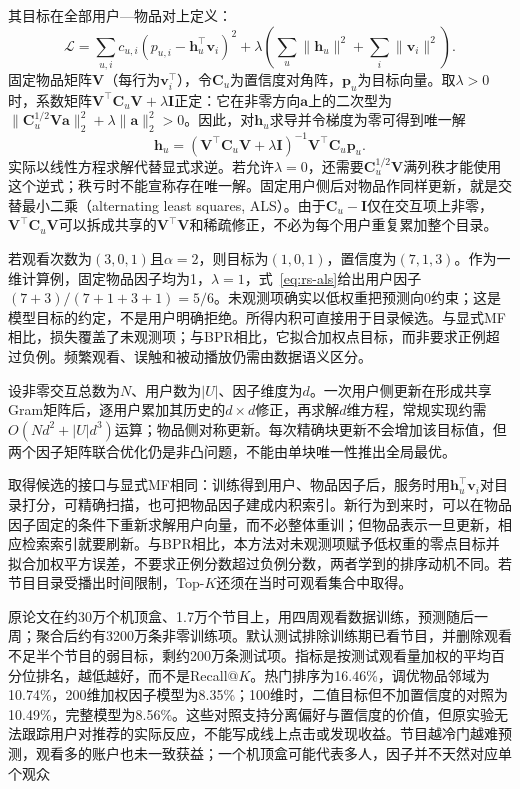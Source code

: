 其目标在全部用户—物品对上定义：
\begin{equation}
 \mathcal L=\sum_{u,i}c_{u,i}(p_{u,i}-\bm h_u^\top\bm v_i)^2
 +\lambda\left(\sum_u\|\bm h_u\|^2+\sum_i\|\bm v_i\|^2\right).
 \label{eq:rs-implicit-mf}
\end{equation}
固定物品矩阵$\bm V$（每行为$\bm v_i^\top$），令$\bm C_u$为置信度对角阵，$\bm p_u$为目标向量。取$\lambda>0$时，系数矩阵$\bm V^\top\bm C_u\bm V+\lambda\bm I$正定：它在非零方向$\bm a$上的二次型为$\|\bm C_u^{1/2}\bm V\bm a\|_2^2+\lambda\|\bm a\|_2^2>0$。因此，对$\bm h_u$求导并令梯度为零可得到唯一解
\begin{equation}
 \bm h_u=(\bm V^\top\bm C_u\bm V+\lambda\bm I)^{-1}
             \bm V^\top\bm C_u\bm p_u.
 \label{eq:rs-als}
\end{equation}
实际以线性方程求解代替显式求逆。若允许$\lambda=0$，还需要$\bm C_u^{1/2}\bm V$满列秩才能使用这个逆式；秩亏时不能宣称存在唯一解。固定用户侧后对物品作同样更新，就是交替最小二乘（alternating least squares, ALS）。由于$\bm C_u-\bm I$仅在交互项上非零，$\bm V^\top\bm C_u\bm V$可以拆成共享的$\bm V^\top\bm V$和稀疏修正，不必为每个用户重复累加整个目录。

若观看次数为$(3,0,1)$且$\alpha=2$，则目标为$(1,0,1)$，置信度为$(7,1,3)$。作为一维计算例，固定物品因子均为1，$\lambda=1$，式~\eqref{eq:rs-als}给出用户因子$(7+3)/(7+1+3+1)=5/6$。未观测项确实以低权重把预测向0约束；这是模型目标的约定，不是用户明确拒绝。所得内积可直接用于目录候选。与显式MF相比，损失覆盖了未观测项；与BPR相比，它拟合加权点目标，而非要求正例超过负例。频繁观看、误触和被动播放仍需由数据语义区分。

设非零交互总数为$N$、用户数为$|U|$、因子维度为$d$。一次用户侧更新在形成共享Gram矩阵后，逐用户累加其历史的$d\times d$修正，再求解$d$维方程，常规实现约需$O(Nd^2+|U|d^3)$运算；物品侧对称更新。每次精确块更新不会增加该目标值，但两个因子矩阵联合优化仍是非凸问题，不能由单块唯一性推出全局最优。

取得候选的接口与显式MF相同：训练得到用户、物品因子后，服务时用$\bm h_u^\top\bm v_i$对目录打分，可精确扫描，也可把物品因子建成内积索引。新行为到来时，可以在物品因子固定的条件下重新求解用户向量，而不必整体重训；但物品表示一旦更新，相应检索索引就要刷新。与BPR相比，本方法对未观测项赋予低权重的零点目标并拟合加权平方误差，不要求正例分数超过负例分数，两者学到的排序动机不同。若节目目录受播出时间限制，Top-$K$还须在当时可观看集合中取得。

原论文在约30万个机顶盒、1.7万个节目上，用四周观看数据训练，预测随后一周；聚合后约有3200万条非零训练项。默认测试排除训练期已看节目，并删除观看不足半个节目的弱目标，剩约200万条测试项。指标是按测试观看量加权的平均百分位排名，越低越好，而不是Recall@$K$。热门排序为16.46\%，调优物品邻域为10.74\%，200维加权因子模型为8.35\%；100维时，二值目标但不加置信度的对照为10.49\%，完整模型为8.56\%。这些对照支持分离偏好与置信度的价值，但原实验无法跟踪用户对推荐的实际反应，不能写成线上点击或发现收益。节目越冷门越难预测，观看多的账户也未一致获益；一个机顶盒可能代表多人，因子并不天然对应单个观众

